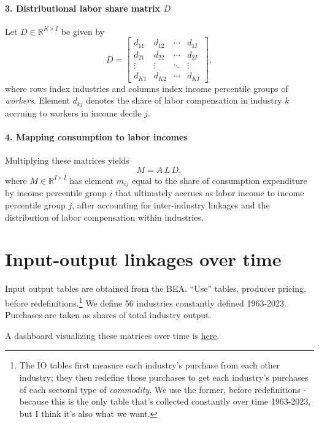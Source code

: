 \documentclass[12pt]{article}
\begin{document}
\paragraph{3. Distributional labor share matrix $D$}  
Let $D \in \mathbb{R}^{K \times I}$ be given by
\[
D =
\begin{bmatrix}
d_{11} & d_{12} & \cdots & d_{1I} \\
d_{21} & d_{22} & \cdots & d_{2I} \\
\vdots & \vdots & \ddots & \vdots \\
d_{K1} & d_{K2} & \cdots & d_{KI}
\end{bmatrix},
\]
where rows index industries and columns index income percentile groups of \emph{workers}.  
Element $d_{kj}$ denotes the share of labor compensation in industry $k$ accruing to workers in income decile $j$.

\paragraph{4. Mapping consumption to labor incomes}  
Multiplying these matrices yields
\[
M = A \, L \, D,
\]
where $M \in \mathbb{R}^{I \times I}$ has element $m_{ij}$ equal to the share of consumption expenditure by income percentile group $i$ that ultimately accrues as labor income to income percentile group $j$, after accounting for inter-industry linkages and the distribution of labor compensation within industries.

\section*{Input-output linkages over time}
Input output tables are obtained from the BEA. ``Use'' tables, producer pricing, before redefinitions.\footnote{The IO tables first measure each industry's purchase from each other industry; they then redefine these purchases to get each industry's purchases of each sectoral type of \emph{commodity}. We use the former, before redefinitions - because this is the only table that's collected constantly over time 1963-2023, but I think it's also what we want.} We define 56 industries constantly defined 1963-2023. Purchases are taken as shares of total industry output.

A dashboard visualizing these matrices over time is \href{https://martin-bernstein.github.io/LCC/figures/exploration/IO-matrices/IO_matrix_dashboard.html}{here}.
\end{document}
